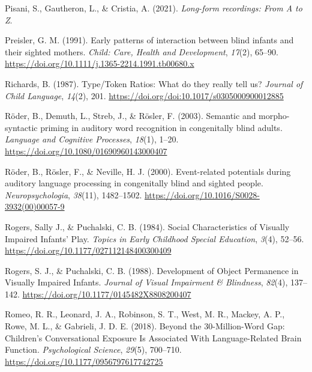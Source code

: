 \documentclass[
  man,floatsintext]{apa6}
\newlength{\cslhangindent}
\newlength{\cslentryspacingunit} %
\newenvironment{CSLReferences}[2] %
 {%
  \setlength{\parindent}{0pt}
  \ifodd #1
  \let\oldpar\par
  \def\par{\hangindent=\cslhangindent\oldpar}
  \fi
  \setlength{\parskip}{#2\cslentryspacingunit}
 }%
 {}
\begin{document}
\begin{CSLReferences}{1}{0}
\leavevmode{}%
Pisani, S., Gautheron, L., \& Cristia, A. (2021). \emph{Long-form recordings: {From A} to {Z}}.

\leavevmode{}%
Preisler, G. M. (1991). Early patterns of interaction between blind infants and their sighted mothers. \emph{Child: Care, Health and Development}, \emph{17}(2), 65--90. \url{https://doi.org/10.1111/j.1365-2214.1991.tb00680.x}

\leavevmode{}%
Richards, B. (1987). Type/{Token Ratios}: What do they really tell us? \emph{Journal of Child Language}, \emph{14}(2), 201. \url{https://doi.org/doi:10.1017/s0305000900012885}

\leavevmode{}%
Röder, B., Demuth, L., Streb, J., \& Rösler, F. (2003). Semantic and morpho-syntactic priming in auditory word recognition in congenitally blind adults. \emph{Language and Cognitive Processes}, \emph{18}(1), 1--20. \url{https://doi.org/10.1080/01690960143000407}

\leavevmode{}%
Röder, B., Rösler, F., \& Neville, H. J. (2000). Event-related potentials during auditory language processing in congenitally blind and sighted people. \emph{Neuropsychologia}, \emph{38}(11), 1482--1502. \url{https://doi.org/10.1016/S0028-3932(00)00057-9}

\leavevmode{}%
Rogers, Sally J., \& Puchalski, C. B. (1984). Social {Characteristics} of {Visually Impaired Infants}' {Play}. \emph{Topics in Early Childhood Special Education}, \emph{3}(4), 52--56. \url{https://doi.org/10.1177/027112148400300409}

\leavevmode{}%
Rogers, S. J., \& Puchalski, C. B. (1988). Development of {Object Permanence} in {Visually Impaired Infants}. \emph{Journal of Visual Impairment \& Blindness}, \emph{82}(4), 137--142. \url{https://doi.org/10.1177/0145482X8808200407}

\leavevmode{}%
Romeo, R. R., Leonard, J. A., Robinson, S. T., West, M. R., Mackey, A. P., Rowe, M. L., \& Gabrieli, J. D. E. (2018). Beyond the 30-{Million-Word Gap}: {Children}'s {Conversational Exposure Is Associated With Language-Related Brain Function}. \emph{Psychological Science}, \emph{29}(5), 700--710. \url{https://doi.org/10.1177/0956797617742725}


\end{CSLReferences}
\end{document}
